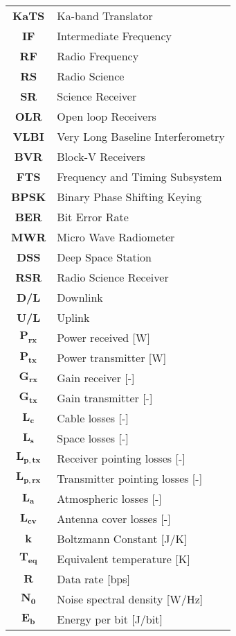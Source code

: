 \begin{multicols}{2}
{\begin{xltabular}{\linewidth}{c>{\raggedright\arraybackslash}X}
		\textbf{KaTS} & Ka-band Translator \\
		\textbf{IF} & Intermediate Frequency \\
		\textbf{RF} & Radio Frequency \\
		\textbf{RS} & Radio Science \\
		\textbf{SR} & Science Receiver\\
		\textbf{OLR} & Open loop Receivers \\
		\textbf{VLBI} & Very Long Baseline Interferometry \\
		\textbf{BVR} & Block-V Receivers \\
		\textbf{FTS} & Frequency and Timing Subsystem \\
		\textbf{BPSK} & Binary Phase Shifting Keying \\ 
		\textbf{BER} & Bit Error Rate \\ 
		\textbf{MWR} & Micro Wave Radiometer \\ 
		\textbf{DSS} & Deep Space Station \\
		\textbf{RSR} & Radio Science Receiver \\
		\textbf{D/L} & Downlink \\
		\textbf{U/L} & Uplink \\
		$\boldsymbol{P_{rx}}$ & Power received [W] \\
		$\boldsymbol{P_{tx}}$ & Power transmitter [W] \\
		$\boldsymbol{G_{rx}}$ & Gain receiver [-] \\
		$\boldsymbol{G_{tx}}$ & Gain transmitter [-] \\
		$\boldsymbol{L_c}$ & Cable losses [-] \\
		$\boldsymbol{L_s}$ & Space losses [-] \\
		$\boldsymbol{L_{p,tx}}$ & Receiver pointing losses [-] \\
		$\boldsymbol{L_{p,rx}}$ & Transmitter pointing losses [-] \\
		$\boldsymbol{L_{a}}$ & Atmospheric losses [-] \\
		$\boldsymbol{L_{cv}}$ & Antenna cover losses [-] \\
		$\boldsymbol{k}$ & Boltzmann Constant [J/K] \\
		$\boldsymbol{T_{eq}}$ & Equivalent temperature [K] \\
		$\boldsymbol{R}$ & Data rate [bps] \\
		$\boldsymbol{N_{0}}$ & Noise spectral density [W/Hz] \\
		$\boldsymbol{E_b}$ & Energy per bit [J/bit] \\

\end{xltabular}}
\end{multicols}
